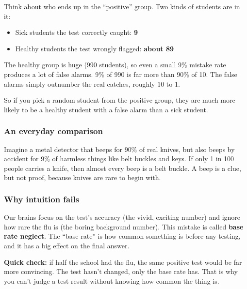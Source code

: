 Think about who ends up in the ``positive'' group. Two kinds of students are in it:

\begin{itemize}
  \item Sick students the test correctly caught: \textbf{9}
  \item Healthy students the test wrongly flagged: \textbf{about 89}
\end{itemize}

The healthy group is huge (990 students), so even a small 9\% mistake rate produces a lot of false alarms. 9\% of 990 is far more than 90\% of 10. The false alarms simply outnumber the real catches, roughly 10 to 1.

So if you pick a random student from the positive group, they are much more likely to be a healthy student with a false alarm than a sick student.

\subsubsection*{An everyday comparison}

Imagine a metal detector that beeps for 90\% of real knives, but also beeps by accident for 9\% of harmless things like belt buckles and keys. If only 1 in 100 people carries a knife, then almost every beep is a belt buckle. A beep is a clue, but not proof, because knives are rare to begin with.

\subsubsection*{Why intuition fails}

Our brains focus on the test's accuracy (the vivid, exciting number) and ignore how rare the flu is (the boring background number). This mistake is called \textbf{base rate neglect}. The ``base rate'' is how common something is before any testing, and it has a big effect on the final answer.

\textbf{Quick check:} if half the school had the flu, the same positive test would be far more convincing. The test hasn't changed, only the base rate has. That is why you can't judge a test result without knowing how common the thing is.